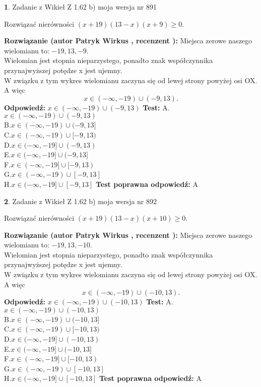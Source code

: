 \documentclass[12pt, a4paper]{article}
\theoremstyle{definition} %
\newtheorem{zad}{}
\newcommand{\zadStart}[1]{\begin{zad}#1\newline}
\newcommand{\zadStop}{\end{zad}}
\newcommand{\rozwStart}[2]{\noindent \textbf{Rozwiązanie (autor #1 , recenzent #2): }\newline}
\newcommand{\rozwStop}{\newline}
\newcommand{\odpStart}{\noindent \textbf{Odpowiedź:}\newline}
\newcommand{\odpStop}{\newline}
\newcommand{\testStart}{\noindent \textbf{Test:}\newline}
\newcommand{\testStop}{\newline}
\newcommand{\kluczStart}{\noindent \textbf{Test poprawna odpowiedź:}\newline}
\newcommand{\kluczStop}{\newline}
\begin{document}
\zadStart{Zadanie z Wikieł Z 1.62 b) moja wersja nr 891}

Rozwiązać nierówności $(x+19)(13-x)(x+9)\ge0$.
\zadStop
\rozwStart{Patryk Wirkus}{}
Miejsca zerowe naszego wielomianu to: $-19, 13, -9$.\\
Wielomian jest stopnia nieparzystego, ponadto znak współczynnika przy\linebreak najwyższej potędze x jest ujemny.\\ W związku z tym wykres wielomianu zaczyna się od lewej strony powyżej osi OX. A więc $$x \in (-\infty,-19) \cup (-9,13).$$
\rozwStop
\odpStart
$x \in (-\infty,-19) \cup (-9,13)$
\odpStop
\testStart
A.$x \in (-\infty,-19) \cup (-9,13)$\\
B.$x \in (-\infty,-19) \cup (-9,13]$\\
C.$x \in (-\infty,-19) \cup [-9,13)$\\
D.$x \in (-\infty,-19] \cup (-9,13)$\\
E.$x \in (-\infty,-19] \cup (-9,13]$\\
F.$x \in (-\infty,-19] \cup [-9,13)$\\
G.$x \in (-\infty,-19) \cup [-9,13]$\\
H.$x \in (-\infty,-19] \cup [-9,13]$
\testStop
\kluczStart
A
\kluczStop



\zadStart{Zadanie z Wikieł Z 1.62 b) moja wersja nr 892}

Rozwiązać nierówności $(x+19)(13-x)(x+10)\ge0$.
\zadStop
\rozwStart{Patryk Wirkus}{}
Miejsca zerowe naszego wielomianu to: $-19, 13, -10$.\\
Wielomian jest stopnia nieparzystego, ponadto znak współczynnika przy\linebreak najwyższej potędze x jest ujemny.\\ W związku z tym wykres wielomianu zaczyna się od lewej strony powyżej osi OX. A więc $$x \in (-\infty,-19) \cup (-10,13).$$
\rozwStop
\odpStart
$x \in (-\infty,-19) \cup (-10,13)$
\odpStop
\testStart
A.$x \in (-\infty,-19) \cup (-10,13)$\\
B.$x \in (-\infty,-19) \cup (-10,13]$\\
C.$x \in (-\infty,-19) \cup [-10,13)$\\
D.$x \in (-\infty,-19] \cup (-10,13)$\\
E.$x \in (-\infty,-19] \cup (-10,13]$\\
F.$x \in (-\infty,-19] \cup [-10,13)$\\
G.$x \in (-\infty,-19) \cup [-10,13]$\\
H.$x \in (-\infty,-19] \cup [-10,13]$
\testStop
\kluczStart
A
\kluczStop
\end{document}
